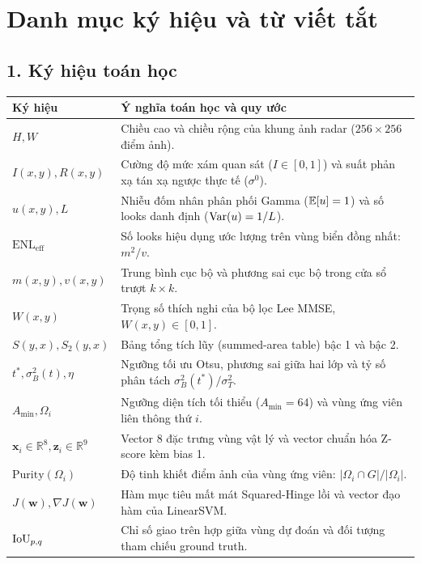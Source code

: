 \clearpage
{}
{}
\chapter*{Danh mục ký hiệu và từ viết tắt}

\begingroup
\small
{}
\section*{1. Ký hiệu toán học}

\begin{table}[!htbp]
\centering
\begin{tabularx}{\textwidth}{p{3.0cm}X}
\toprule
\textbf{Ký hiệu} & \textbf{Ý nghĩa toán học và quy ước} \\
\midrule
$H, W$ & Chiều cao và chiều rộng của khung ảnh radar ($256 \times 256$ điểm ảnh). \\
$I(x, y), R(x, y)$ & Cường độ mức xám quan sát ($I \in [0, 1]$) và suất phản xạ tán xạ ngược thực tế ($\sigma^0$). \\
$u(x, y), L$ & Nhiễu đốm nhân phân phối Gamma ($\mathbb{E}[u] = 1$) và số looks danh định ($\mathrm{Var}(u) = 1/L$). \\
$\text{ENL}_{\text{eff}}$ & Số looks hiệu dụng ước lượng trên vùng biển đồng nhất: $m^2 / v$. \\
$m(x, y), v(x, y)$ & Trung bình cục bộ và phương sai cục bộ trong cửa sổ trượt $k \times k$. \\
$W(x, y)$ & Trọng số thích nghi của bộ lọc Lee MMSE, $W(x, y) \in [0, 1]$. \\
$S(y, x), S_2(y, x)$ & Bảng tổng tích lũy (summed-area table) bậc 1 và bậc 2. \\
$t^*, \sigma_B^2(t), \eta$ & Ngưỡng tối ưu Otsu, phương sai giữa hai lớp và tỷ số phân tách $\sigma_B^2(t^*) / \sigma_T^2$. \\
$A_{\min}, \Omega_i$ & Ngưỡng diện tích tối thiểu ($A_{\min} = 64$) và vùng ứng viên liên thông thứ $i$. \\
$\mathbf{x}_i \in \mathbb{R}^8, \mathbf{z}_i \in \mathbb{R}^9$ & Vector 8 đặc trưng vùng vật lý và vector chuẩn hóa Z-score kèm bias 1. \\
$\mathrm{Purity}(\Omega_i)$ & Độ tinh khiết điểm ảnh của vùng ứng viên: $|\Omega_i \cap G| / |\Omega_i|$. \\
$J(\mathbf{w}), \nabla J(\mathbf{w})$ & Hàm mục tiêu mất mát Squared-Hinge lồi và vector đạo hàm của LinearSVM. \\
$\mathrm{IoU}_{p, q}$ & Chỉ số giao trên hợp giữa vùng dự đoán và đối tượng tham chiếu ground truth. \\
\bottomrule
\end{tabularx}
\end{table}

